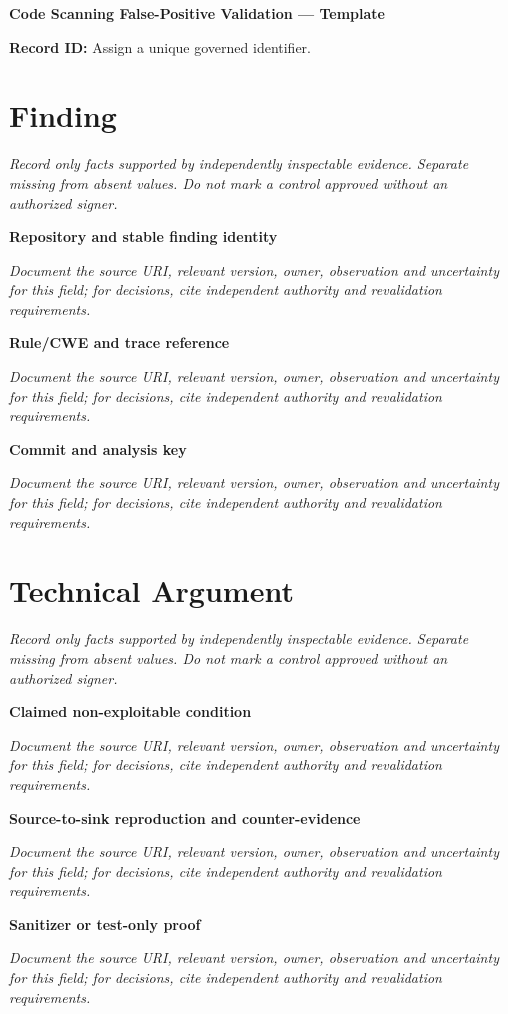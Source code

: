 \documentclass[11pt,letterpaper]{article}
\begin{document}
\begin{center}{\LARGE\bfseries Code Scanning False-Positive Validation --- Template}\par
\vspace{4pt}{\small Guided authoring instrument (not a completed assessment)}\par
\end{center}
\noindent\textbf{Record ID:} Assign a unique governed identifier.\par
\section{Finding}
\noindent\emph{Record only facts supported by independently inspectable evidence. Separate missing from absent values. Do not mark a control approved without an authorized signer.}\par
\noindent\textbf{Repository and stable finding identity}\par
\noindent\emph{Document the source URI, relevant version, owner, observation and uncertainty for this field; for decisions, cite independent authority and revalidation requirements.}\par\medskip
\noindent\textbf{Rule/CWE and trace reference}\par
\noindent\emph{Document the source URI, relevant version, owner, observation and uncertainty for this field; for decisions, cite independent authority and revalidation requirements.}\par\medskip
\noindent\textbf{Commit and analysis key}\par
\noindent\emph{Document the source URI, relevant version, owner, observation and uncertainty for this field; for decisions, cite independent authority and revalidation requirements.}\par\medskip
\section{Technical Argument}
\noindent\emph{Record only facts supported by independently inspectable evidence. Separate missing from absent values. Do not mark a control approved without an authorized signer.}\par
\noindent\textbf{Claimed non-exploitable condition}\par
\noindent\emph{Document the source URI, relevant version, owner, observation and uncertainty for this field; for decisions, cite independent authority and revalidation requirements.}\par\medskip
\noindent\textbf{Source-to-sink reproduction and counter-evidence}\par
\noindent\emph{Document the source URI, relevant version, owner, observation and uncertainty for this field; for decisions, cite independent authority and revalidation requirements.}\par\medskip
\noindent\textbf{Sanitizer or test-only proof}\par
\noindent\emph{Document the source URI, relevant version, owner, observation and uncertainty for this field; for decisions, cite independent authority and revalidation requirements.}\par\medskip
\end{document}
